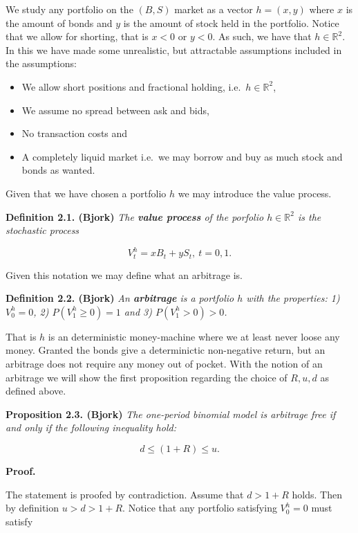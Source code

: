\documentclass[a4paper,12pt,openany]{book}
\providecommand{\tightlist}{%
 \setlength{\itemsep}{0pt}\setlength{\parskip}{0pt}}
\begin{document}
We study any portfolio on the \((B,S)\) market as a vector \(h=(x,y)\) where \(x\) is the amount of bonds and \(y\) is the amount of stock held in the portfolio. Notice that we allow for shorting, that is \(x<0\) or \(y<0\). As such, we have that \(h\in \mathbb{R}^2\). In this we have made some unrealistic, but attractable assumptions included in the assumptions:

\begin{itemize}
\tightlist
\item
  We allow short positions and fractional holding, i.e.~\(h\in \mathbb{R}^2\),
\item
  We assume no spread between ask and bids,
\item
  No transaction costs and
\item
  A completely liquid market i.e.~we may borrow and buy as much stock and bonds as wanted.
\end{itemize}

Given that we have chosen a portfolio \(h\) we may introduce the value process.

\textbf{Definition 2.1. (Bjork)} \emph{The \textbf{value process} of the porfolio \(h\in\mathbb{R}^2\) is the stochastic process}

\[
V^h_t=xB_t+yS_t,\ t=0,1.
\]

Given this notation we may define what an arbitrage is.

\textbf{Definition 2.2. (Bjork)} \emph{An \textbf{arbitrage} is a portfolio \(h\) with the properties: 1) \(V^h_0=0\), 2) \(P(V^h_1\ge 0)=1\) and 3) \(P(V^h_1>0)>0\).}

That is \(h\) is an deterministic money-machine where we at least never loose any money. Granted the bonds give a determinictic non-negative return, but an arbitrage does not require any money out of pocket. With the notion of an arbitrage we will show the first proposition regarding the choice of \(R,u,d\) as defined above.

\textbf{Proposition 2.3. (Bjork)} \emph{The one-period binomial model is arbitrage free if and only if the following inequality hold:}

\[
d\le (1+R)\le u.\tag{2.1}
\]

\textbf{Proof.}

The statement is proofed by contradiction. Assume that \(d>1+R\) holds. Then by definition \(u>d>1+R\). Notice that any portfolio satisfying \(V_0^h=0\) must satisfy
\end{document}
